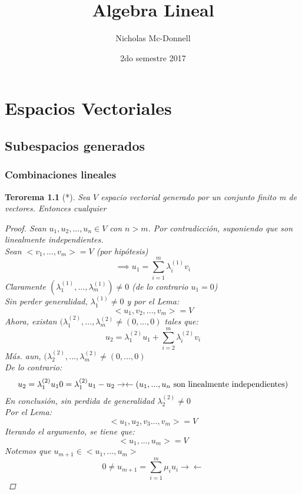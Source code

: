 \documentclass[11pt]{book}
\title{Algebra Lineal}
\author{Nicholas Mc-Donnell}
\date{2do semestre 2017}
\newtheorem{thm}{Terorema}[section]
\theoremstyle{definition}
\begin{document}
\maketitle
{}

\tableofcontents
{}
\chapter{Espacios Vectoriales}
\section{Subespacios generados}
\subsection{Combinaciones lineales}
\begin{thm}[*]
	Sea $V$ espacio vectorial generado por un conjunto finito m de vectores. Entonces cualquier

	\begin{proof}
		Sean $u_1,u_2,...,u_n\in V$ con $n>m$. Por contradicción, suponiendo que son linealmente independientes.\\
		Sean $<v_1,...,v_m>=V$ (por hipótesis)
		\[
		\implies u_1=\sum^m_{i=1}\lambda_i^{(1)} v_i
		\]
		Claramente $(\lambda_1^{(1)},...,\lambda_m^{(1)})\neq 0$ (de lo contrario $u_1=0$)\\
		Sin perder generalidad, $\lambda_1^{(1)}\neq 0$ y por el Lema:
		\[
		<u_1,v_2,...,v_m>=V
		\]
		Ahora, existan $(\lambda_1^{(2)},...,\lambda_m^{(2)}\neq(0,...,0)$ tales que:
		\[
		u_2=\lambda_1^{(2)} u_1+\sum^m_{i=2}\lambda_i^{(2)}v_i
		\]
		Más. aun, $(\lambda_2^{(2)},...,\lambda_m^{(2)}\neq(0,...,0)$\\
		De lo contrario:
		\[
		u_2=\lambda_1^{(2)}u_1\\
		0=\lambda_1^{(2)}u_1-u_2\\
		\rightarrow\leftarrow (u_1,...,u_n\textrm{ son linealmente independientes})
		\]
		En conclusión, sin perdida de generalidad  $\lambda_2^{(2)}\neq 0$\\
		Por el Lema:
		\[
		<u_1,u_2,v_3...,v_m>=V
		\]
		Iterando el argumento, se tiene que:
		\[
		<u_1,...,u_m>=V
		\]
		Notemos que $u_{m+1}\in<u_1,...,u_m>$
		\[
		0\neq u_{m+1}=\sum^m_{i=1}\mu_i u_i
		\rightarrow\leftarrow
		\]		
	\end{proof}
\end{thm}
\end{document}
